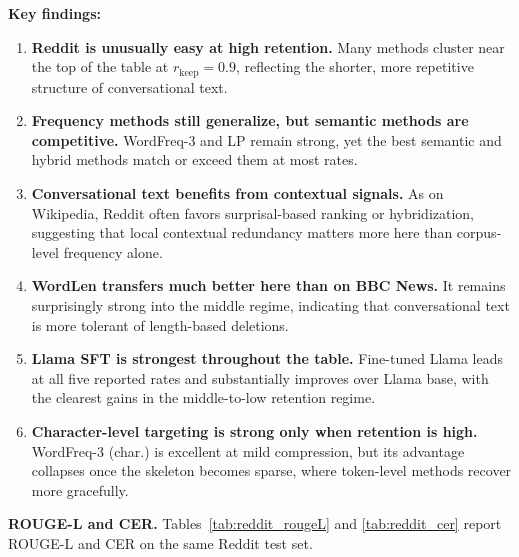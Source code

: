 \documentclass[11pt]{article}
\newcommand{\rkeep}{r_{\mathrm{keep}}}
\begin{document}
\textbf{Key findings:}
\begin{enumerate}
    \item \textbf{Reddit is unusually easy at high retention.} Many methods cluster near the top of the table at $\rkeep=0.9$, reflecting the shorter, more repetitive structure of conversational text.
    \item \textbf{Frequency methods still generalize, but semantic methods are competitive.} WordFreq-3 and LP remain strong, yet the best semantic and hybrid methods match or exceed them at most rates.
    \item \textbf{Conversational text benefits from contextual signals.} As on Wikipedia, Reddit often favors surprisal-based ranking or hybridization, suggesting that local contextual redundancy matters more here than corpus-level frequency alone.
    \item \textbf{WordLen transfers much better here than on BBC News.} It remains surprisingly strong into the middle regime, indicating that conversational text is more tolerant of length-based deletions.
    \item \textbf{Llama SFT is strongest throughout the table.} Fine-tuned Llama leads at all five reported rates and substantially improves over Llama base, with the clearest gains in the middle-to-low retention regime.
    \item \textbf{Character-level targeting is strong only when retention is high.} WordFreq-3 (char.) is excellent at mild compression, but its advantage collapses once the skeleton becomes sparse, where token-level methods recover more gracefully.
\end{enumerate}

\textbf{ROUGE-L and CER.}
Tables~\ref{tab:reddit_rougeL} and \ref{tab:reddit_cer} report ROUGE-L and CER
on the same Reddit test set.
\end{document}
